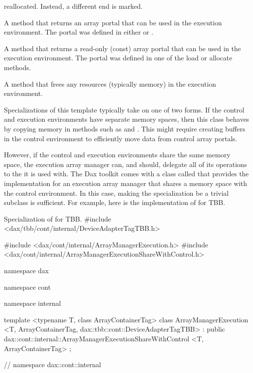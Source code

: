 \begin{description}
  reallocated. Instead, a different end is marked.
\item[\textcode{GetPortal}] A method that returns an array portal
  that can be used in the execution environment. The portal was defined in
  either  or
  .
\item[\textcode{GetPortalConst}] A method that returns a read-only
  (const) array portal that can be used in the execution environment. The
  portal was defined in one of the load or allocate methods.
\item[\textcode{ReleaseResources}] A method that frees any resources
  (typically memory) in the execution environment.
\end{description}

Specializations of this template typically take on one of two forms. If the
control and execution environments have separate memory spaces, then this
class behaves by copying memory in methods such as
 and . This might
require creating buffers in the control environment to efficiently move
data from control array portals.

However, if the control and execution environments share the same memory
space, the execution array manager can, and should, delegate all of its
operations to the  it is used
with. The Dax toolkit comes with a class called
 that provides the
implementation for an execution array manager that shares a memory space
with the control environment. In this case, making the
 specialization be a trivial subclass
is sufficient. For example, here is the implementation of
 for TBB.

\begin{daxexample}{Specialization of  for TBB.}
#include <dax/tbb/cont/internal/DeviceAdapterTagTBB.h>

#include <dax/cont/internal/ArrayManagerExecution.h>
#include <dax/cont/internal/ArrayManagerExecutionShareWithControl.h>

namespace dax {
namespace cont {
namespace internal {

template <typename T, class ArrayContainerTag>
class ArrayManagerExecution
    <T, ArrayContainerTag, dax::tbb::cont::DeviceAdapterTagTBB>
    : public dax::cont::internal::ArrayManagerExecutionShareWithControl
        <T, ArrayContainerTag>
{
};

}
}
} // namespace dax::cont::internal
\end{daxexample}


